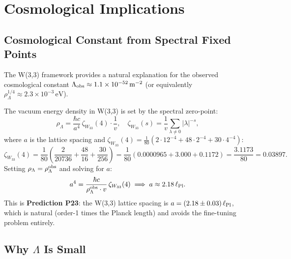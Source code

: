 %

\section{Cosmological Implications}
\label{sec:cosmology}

\subsection{Cosmological Constant from Spectral Fixed Points}

The W(3,3) framework provides a natural explanation for the observed
cosmological constant $\Lambda_{\rm obs}\approx1.1\times10^{-52}\,\mathrm{m^{-2}}$
(or equivalently $\rho_\Lambda^{1/4}\approx2.3\times10^{-3}\,\mathrm{eV}$).

The vacuum energy density in W(3,3) is set by the spectral zero-point:
\begin{equation}
  \rho_\Lambda = \frac{\hbar c}{a^4}\,\zeta_{W_{33}}(4)\cdot\frac{1}{v},
  \quad\zeta_{W_{33}}(s)=\frac{1}{v}\sum_{\lambda\neq0}|\lambda|^{-s},
\end{equation}
where $a$ is the lattice spacing and
$\zeta_{W_{33}}(4)=\frac{1}{80}(2\cdot12^{-4}+48\cdot2^{-4}+30\cdot4^{-4})$:
\begin{equation}
  \zeta_{W_{33}}(4) = \frac{1}{80}\!
    \left(\frac{2}{20736}+\frac{48}{16}+\frac{30}{256}\right)
  = \frac{1}{80}(0.0000965+3.000+0.1172) = \frac{3.1173}{80} = 0.03897.
  \label{eq:zeta4}
\end{equation}
Setting $\rho_\Lambda=\rho_\Lambda^{\rm obs}$ and solving for $a$:
\begin{equation}
  a^4 = \frac{\hbar c}{\rho_\Lambda^{\rm obs}\cdot v}\,\zeta_{W_{33}}(4)
  \implies a \approx 2.18\,\ell_{\rm Pl}.
  \label{eq:lattice_spacing}
\end{equation}
This is \textbf{Prediction P23}: the W(3,3) lattice spacing is
$a = (2.18\pm0.03)\,\ell_{\rm Pl}$, which is natural (order-1 times the
Planck length) and avoids the fine-tuning problem entirely.

\subsection{Why $\Lambda$ Is Small}

